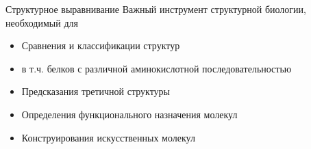 \documentclass[utf8, professionalfont]{beamer}
\begin{document}
\begin{frame}{Структурное выравнивание}
Важный инструмент структурной биологии, необходимый для

\begin{itemize}
	\item Сравнения и классификации структур
	\item в т.ч. белков с различной аминокислотной последовательностью
	\item Предсказания третичной структуры
	\item Определения функционального назначения молекул
	\item Конструирования искусственных молекул
\end{itemize}

\end{frame}
\end{document}
